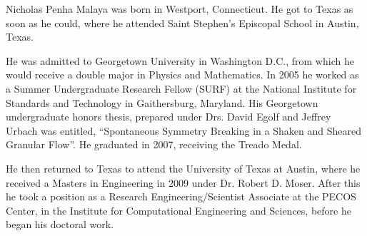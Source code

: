 
Nicholas Penha Malaya was born in Westport, Connecticut. He got to Texas
as soon as he could, where he attended Saint Stephen's Episcopal School in
Austin, Texas. 

He was admitted to Georgetown University in Washington D.C., from
which he would receive a double major in Physics and Mathematics. In
2005 he worked as a Summer Undergraduate Research Fellow (SURF) at the
National Institute for Standards and Technology in Gaithersburg,
Maryland. His Georgetown undergraduate honors thesis, prepared under
Drs\@. David Egolf and Jeffrey Urbach was entitled, ``Spontaneous
Symmetry Breaking in a Shaken and Sheared Granular Flow''. He graduated
in 2007, receiving the Treado Medal.   

He then returned to Texas to attend the University of Texas at
Austin, where he received a Masters in Engineering in 2009 under
Dr\@. Robert D. Moser. After this he took a position as a Research
Engineering/Scientist Associate at the PECOS Center, in the Institute
for Computational Engineering and Sciences, before he began his
doctoral work. 


